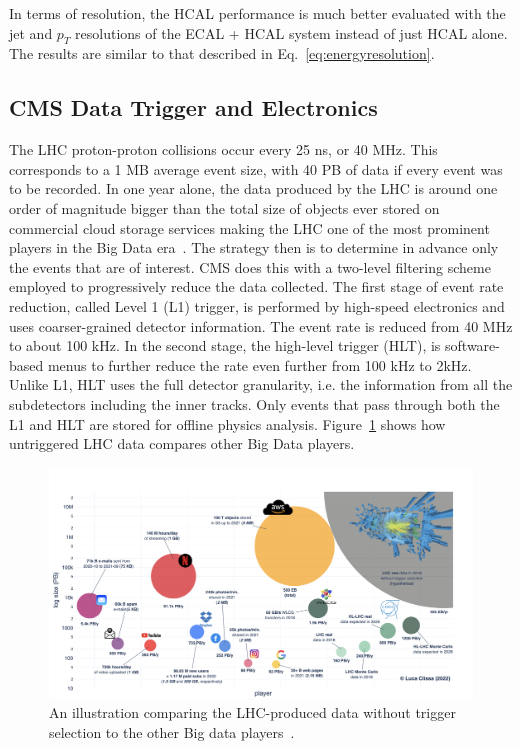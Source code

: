In terms of resolution, the HCAL performance is much better evaluated with the jet and $p_T$ resolutions of the ECAL + HCAL system instead of just HCAL alone. The results are similar to that described in Eq.~\ref{eq:energyresolution}.

\subsection{CMS Data Trigger and Electronics }

The LHC proton-proton collisions occur every 25 ns, or 40 MHz. This corresponds to a 1 MB average event size, with 40 PB of data if every event was to be recorded. In one year alone, the data produced by the LHC is around one order of magnitude bigger than the total size of objects ever stored on commercial cloud storage services making the LHC one of the most prominent players in the Big Data era~\cite{Clissa:2021}. The strategy then is to determine in advance only the events that are of interest. CMS does this with a two-level filtering scheme employed to progressively reduce the data collected. The first stage of event rate reduction, called Level 1 (L1) trigger, is performed by high-speed electronics and uses coarser-grained detector information. The event rate is reduced from 40 MHz to about 100 kHz. In the second stage, the high-level trigger (HLT), is software-based menus to further reduce the rate even further from 100 kHz to 2kHz. Unlike L1, HLT uses the full detector granularity, i.e. the information from all the subdetectors including the inner tracks. Only events that pass through both the L1 and HLT are stored for offline physics analysis. Figure~\ref{fig:LHC_BigData} shows how untriggered LHC data compares other Big Data players. 


\begin{figure}[htbp!]
\caption{An illustration comparing the LHC-produced data without trigger selection to the other Big data players~\cite{Clissa:2021}.}
\begin{center}
\includegraphics[scale=0.4]{fig/BigData.png}
\end{center}
\label{fig:LHC_BigData}
\end{figure}


